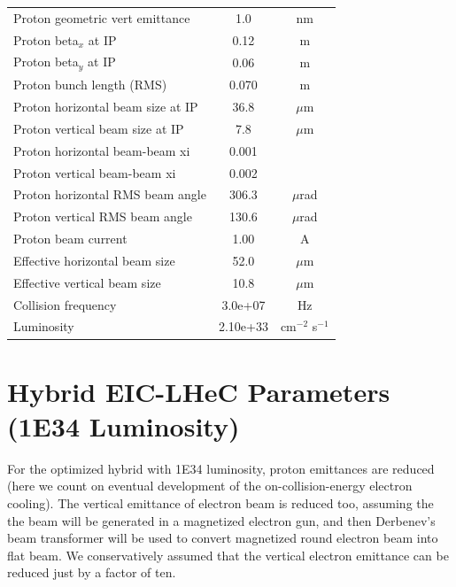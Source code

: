 \documentclass{article}
\begin{document}
\begin{longtable}{lcc}
Proton geometric vert emittance & 1.0 & nm \\
Proton beta$_x$ at IP & 0.12 & m \\
Proton beta$_y$ at IP & 0.06 & m \\
Proton bunch length (RMS) & 0.070 & m \\
Proton horizontal beam size at IP & 36.8 & $\mu$m \\
Proton vertical beam size at IP & 7.8 & $\mu$m \\
Proton horizontal beam-beam xi & 0.001 &  \\
Proton vertical beam-beam xi & 0.002 &  \\
Proton horizontal RMS beam angle & 306.3 & $\mu$rad \\
Proton vertical RMS beam angle & 130.6 & $\mu$rad \\
Proton beam current & 1.00 & A \\
Effective horizontal beam size & 52.0 & $\mu$m \\
Effective vertical beam size & 10.8 & $\mu$m \\
Collision frequency & 3.0e+07 & Hz \\
Luminosity & 2.10e+33 & cm$^{-2}$ s$^{-1}$ \\
\bottomrule
\end{longtable}

\section{Hybrid EIC-LHeC Parameters (1E34 Luminosity)}

For the optimized hybrid with 1E34 luminosity, proton emittances are reduced (here we count on eventual development of the on-collision-energy electron cooling). The vertical emittance of electron beam is reduced too, assuming the the beam will be generated in a magnetized electron gun, and then Derbenev's beam transformer will be used to convert magnetized round electron beam into flat beam. We conservatively assumed that the vertical electron emittance can be reduced just by a factor of ten. 
\end{document}
